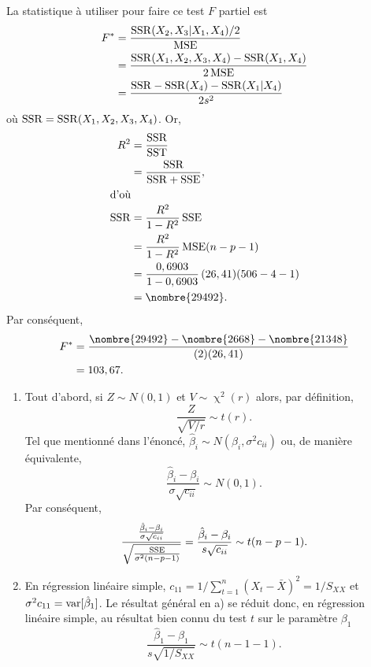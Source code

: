 \begin{solution}{3.12}
    La statistique à utiliser pour faire ce test $F$ partiel est
    \begin{align*}
      F^*
      &= \frac{\mathrm{SSR}(X_2, X_3|X_1, X_4)/2}{\mathrm{MSE}} \\
      &= \frac{\mathrm{SSR}(X_1, X_2, X_3, X_4) - \mathrm{SSR}(X_1, X_4)}{2\, \mathrm{MSE}} \\
      &= \frac{\mathrm{SSR} - \mathrm{SSR}(X_4) - \mathrm{SSR}(X_1|X_4)}{2 s^2}
    \end{align*}
    où $\mathrm{SSR} = \mathrm{SSR}(X_1,X_2,X_3,X_4)$. Or,
    \begin{align*}
      R^2
      &= \frac{\SSR}{\SST} \\
      &= \frac{\SSR}{\SSR + \SSE}, \\
      \intertext{d'où}
      \SSR
      &= \frac{R^2}{1 - R^2}\, \SSE \\
      &= \frac{R^2}{1 - R^2}\, \MSE (n - p - 1) \\
      &= \frac{0,6903}{1 - 0,6903}\, (26,41) (506 - 4 - 1) \\
      &= \nombre{29492}.
    \end{align*}
    Par conséquent,
    \begin{align*}
      F^*
      &= \frac{\nombre{29492} - \nombre{2668} - \nombre{21348}}{%
        (2) (26,41)} \\
      &= 103,67.
    \end{align*}
  
\end{solution}
\begin{solution}{3.13}
    \begin{enumerate}
    \item Tout d'abord, si $Z \sim N(0,1)$ et $V \sim \upchi^2(r)$
      alors, par définition,
      \begin{displaymath}
        \frac{Z}{\sqrt{V/r}} \sim t(r).
      \end{displaymath}
      Tel que mentionné dans l'énoncé, $\hat{\beta}_i \sim N(\beta_i,
      \sigma^2 c_{ii})$ ou, de manière équivalente,
      \begin{displaymath}
        \frac{\hat{\beta}_i - \beta_i}{\sigma \sqrt{c_{ii}}} \sim
        N(0, 1).
      \end{displaymath}
      Par conséquent,
      \begin{displaymath}
        \frac{\frac{\hat{\beta}_i - \beta_i}{\sigma \sqrt{c_{ii}}}}{%
          \sqrt{\frac{\SSE}{\sigma^2(n - p - 1)}}}
        = \frac{\hat{\beta}_i - \beta_i}{s \sqrt{c_{ii}}}
        \sim t(n - p - 1).
      \end{displaymath}
    \item En régression linéaire simple, $c_{11} = 1/\sum_{t = 1}^n
      (X_t - \bar{X})^2 = 1/S_{XX}$ et $\sigma^2 c_{11} =
      \mathrm{var} [ \hat{\beta}_1 ]$. Le résultat général en a) se réduit donc,
      en régression linéaire simple, au résultat bien connu du test $t$
      sur le paramètre $\beta_1$
      \begin{displaymath}
        \frac{\hat{\beta}_1 - \beta_1}{s \sqrt{1/S_{XX}}}
        \sim t(n - 1 - 1).
      \end{displaymath}
    \end{enumerate}
  
\end{solution}
